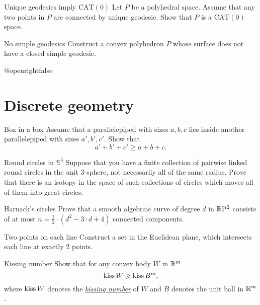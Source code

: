 \documentclass[twoside]{book}
\begin{document}
{\begin{pr}{\easy}{Unique geodesics imply $\mathrm{CAT}(0)$}\label{Unique geodesics imply CAT}
Let $P$ be a polyhedral space.
Assume that any two points in $P$ 
are connected by unique geodesic.
Show that $P$ is a $\mathrm{CAT}(0)$ space.
\end{pr}

\begin{pr}{\easy}{No simple geodesics}\label{No simple geodesics}
Construct a convex polyhedron $P$ whose surface 
does not have a closed simple geodesic.
\end{pr}




\csname @openrightfalse\endcsname
\chapter{Discrete geometry}



\begin{pr}{}{Box in a box}\label{box-in-box} 
Assume that a parallelepiped with sizes $a,b,c$ 
lies inside another parallelepiped with sizes $a',b',c'$. 
Show that 
\[a'+b'+c'\ge a+b+c.\]

\end{pr}


\begin{pr}{\easy}{Round circles in $\mathbb{S}^3$}\label{Round circles}
Suppose that you have a finite collection of pairwise linked round circles in the unit 3-sphere, 
not necessarily all of the same radius. 
Prove that there is an isotopy in the space of such collections of circles 
which moves all of them into great circles.
\end{pr}

\begin{pr}{}{Harnack's circles}\label{Harnack}
Prove that a smooth algebraic curve of degree $d$ in $\RP^2$ consists of at most $n=\tfrac12\cdot(d^2-3\cdot d+4)$ connected components.
\end{pr}

\begin{pr}{}{Two points on each line}\label{2pts-on-line}
Construct a set in the Euclidean plane, 
which intersects each line at exactly 2 points. 
\end{pr}





\begin{pr}{\easy}{Kissing number}\label{pr:Kissing number}
Show that for any convex body $W$ in $\RR^m$
$$\mathop{\rm kiss}W\ge \mathop{\rm kiss}B^m,$$
where $\mathop{\rm kiss}W$ denotes the \hyperref[Kissing number]{\emph{kissing number}}
of $W$ and $B$ denotes the unit ball in $\RR^m$.
\end{pr}

}
\end{document}
